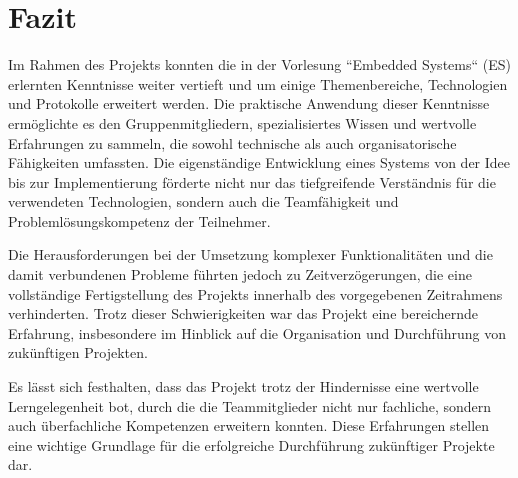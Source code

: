 \newpage
\section{Fazit}

Im Rahmen des Projekts konnten die in der Vorlesung ``Embedded Systems`` (ES) erlernten Kenntnisse weiter vertieft und um einige Themenbereiche, Technologien und Protokolle erweitert werden. 
Die praktische Anwendung dieser Kenntnisse ermöglichte es den Gruppenmitgliedern, spezialisiertes Wissen und wertvolle Erfahrungen zu sammeln, die sowohl technische als auch organisatorische Fähigkeiten umfassten. Die eigenständige Entwicklung eines Systems von der Idee bis zur Implementierung förderte nicht nur das tiefgreifende Verständnis für die verwendeten Technologien, sondern auch die Teamfähigkeit und Problemlösungskompetenz der Teilnehmer.

Die Herausforderungen bei der Umsetzung komplexer Funktionalitäten und die damit verbundenen Probleme führten jedoch zu Zeitverzögerungen, die eine vollständige Fertigstellung des Projekts innerhalb des vorgegebenen Zeitrahmens verhinderten. Trotz dieser Schwierigkeiten war das Projekt eine bereichernde Erfahrung, insbesondere im Hinblick auf die Organisation und Durchführung von zukünftigen Projekten.

Es lässt sich festhalten, dass das Projekt trotz der Hindernisse eine wertvolle Lerngelegenheit bot, durch die die Teammitglieder nicht nur fachliche, sondern auch überfachliche Kompetenzen erweitern konnten. Diese Erfahrungen stellen eine wichtige Grundlage für die erfolgreiche Durchführung zukünftiger Projekte dar.
